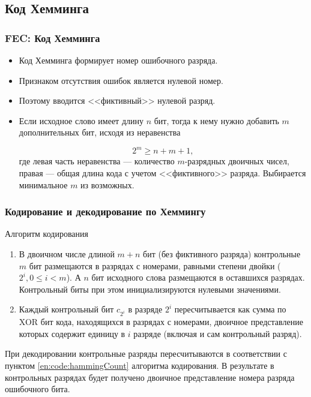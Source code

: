 \subsection{Код Хемминга}

\begin{frame}
    \frametitle{FEC: Код Хемминга}
    
    \begin{itemize}    
        \item Код Хемминга формирует номер ошибочного разряда. 
        \item Признаком отсутствия ошибок является нулевой номер. 
        \item Поэтому вводится <<фиктивный>> нулевой разряд. 
        \item Если исходное слово имеет длину $n$ бит, тогда к нему нужно добавить $m$ дополнительных бит, исходя из неравенства
        
        \begin{equation}
            \label{eq:code:hammingM}
            2^m\geq n + m + 1,
        \end{equation}
        где левая часть неравенства --- количество $m$-разрядных двоичных чисел, правая --- общая длина кода с учетом <<фиктивного>> разряда. Выбирается минимальное $m$ из возможных.
    \end{itemize}    
\end{frame}

\begin{frame}
    \frametitle{Кодирование и декодирование по Хеммингу}
    
    Алгоритм кодирования
    \begin{enumerate}
        \item В двоичном числе длиной $m+n$ бит (без фиктивного разряда) контрольные $m$ бит размещаются в разрядах с номерами, равными степени двойки ($2^i,0\leq i<m$). А $n$ бит исходного слова размещаются в оставшихся разрядах. Контрольный биты при этом инициализируются нулевыми значениями.
        
        \item\label{en:code:hammingCount} Каждый контрольный бит $c_{2^i}$ в разряде $2^i$ пересчитывается как сумма по XOR бит кода, находящихся в разрядах с номерами, двоичное представление которых содержит единицу в $i$ разряде (включая и сам контрольный разряд).
    \end{enumerate}
    
    При декодировании контрольные разряды пересчитываются в соответствии с пунктом \ref{en:code:hammingCount} алгоритма кодирования. В результате в контрольных разрядах будет получено двоичное представление номера разряда ошибочного бита.
\end{frame}



